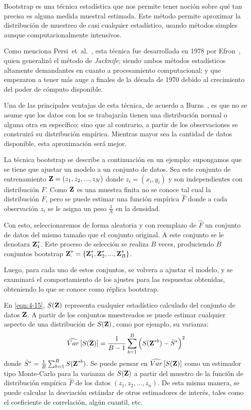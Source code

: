 Bootstrap es una técnica estadística que nos permite tener noción sobre qué tan precisa es alguna medida muestral estimada. Este método permite aproximar la distribución de muestreo de casi cualquier estadístico, usando métodos simples aunque computacionalmente intensivos. 

Como menciona Persi~et~al.~\cite{Diaconis1983}, esta técnica fue desarrollada en 1978 por Efron~\cite{Efron1978}, quien generalizó el método de \textit{Jacknife}; siendo ambos métodos estadísticos altamente demandantes en cuanto a procesamiento computacional; y que empezaron a tener más auge a finales de la década de 1970 debido al crecimiento del poder de cómputo disponible.

Una de las principales ventajas de esta técnica, de acuerdo a Burns~\cite{Burns2013}, es que no se asume que los datos con los se trabajarán tienen una distribución normal o alguna otra en específico; sino que al contrario, a partir de los observaciones se construirá su distribución empírica. Mientras mayor sea la cantidad de datos disponible, esta aproximación será mejor.

La técnica bootstrap se describe a continuación en un ejemplo: supongamos que se tiene que ajustar un modelo a un conjunto de datos. Sea este conjunto de entrenamiento $\textbf{Z} = (z_1, z_2, ..., z_N)$ donde $z_i = (x_i, y_i)$ y son independientes con distribución $F$. Como $\textbf{Z}$ es una muestra finita no se conoce tal cual la distribución $F$, pero se puede estimar una función empírica $\hat F$ donde a cada observación $z_i$ se le asigna un peso $\frac{1}{N}$ en la densidad.

Con esto, seleccionaremos de forma aleatoria y con reemplazo de $\hat{F}$ un conjunto de datos del mismo tamaño que el conjunto original. A este conjunto se le denotara $\textbf{Z}^{*}_1$. Este proceso de selección se realiza $B$ veces, produciendo $B$ conjuntos bootstrap $\textbf{Z}^{*}_{\cdot} = \lbrace \textbf{Z}^{*}_1, \textbf{Z}^{*}_2, ..., \textbf{Z}^{*}_B \rbrace$. 

Luego, para cada uno de estos conjuntos, se volvera a ajustar el modelo, y se examinará el comportamiento de los ajustes para las respuestas obtenidas, obteniendo lo que se conoce como réplica bootstrap.

En \eqref{eqn:4-15}, $S(\textbf{Z})$ representa cualquier estadístico calculado del conjunto de datos $\textbf{Z}$. A partir de los conjuntos muestreados se puede estimar cualquier aspecto de una distribución de $S(\textbf{Z})$, como por ejemplo, su varianza: 
\begin{equation}
\widehat{Var} \left[ S(\textbf{Z}) \right] = \frac{1}{B-1} \sum_{b=1}^B \left( S(\textbf{Z}^{*b}) - \bar{S}^{*} \right)^2
\label{eqn:4-15}
\end{equation}
donde $\bar{S}^{*} = \frac{1}{B} \sum_{b=1}^B S(\textbf{Z}^{*b})$. Se puede pensar en $\widehat{Var} \left[ S(\textbf{Z}) \right]$ como un estimador tipo Monte-Carlo para la varianza de $S(\textbf{Z})$ a partir del muestro de la función de distribución empírica $\widehat{F}$ de los datos $(z_1, z_2, ..., z_n)$. De esta misma manera, se puede calcular la desviación estándar de otros estimadores de interés, tales como el coeficiente de correlación, algún cuantil, etc.

